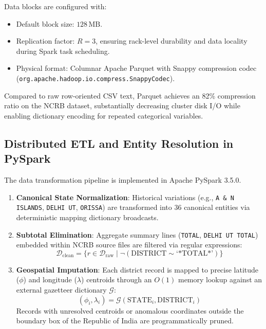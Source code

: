 \documentclass[conference]{IEEEtran}
\begin{document}
Data blocks are configured with:
\begin{itemize}
    \item Default block size: $128\,\text{MB}$.
    \item Replication factor: $R = 3$, ensuring rack-level durability and data locality during Spark task scheduling.
    \item Physical format: Columnar Apache Parquet with Snappy compression codec (\texttt{org.apache.hadoop.io.compress.SnappyCodec}).
\end{itemize}

Compared to raw row-oriented CSV text, Parquet achieves an 82\% compression ratio on the NCRB dataset, substantially decreasing cluster disk I/O while enabling dictionary encoding for repeated categorical variables.

\subsection{Distributed ETL and Entity Resolution in PySpark}
The data transformation pipeline is implemented in Apache PySpark 3.5.0. 
\begin{enumerate}
    \item \textbf{Canonical State Normalization}: Historical variations (e.g., \texttt{A \& N ISLANDS}, \texttt{DELHI UT}, \texttt{ORISSA}) are transformed into 36 canonical entities via deterministic mapping dictionary broadcasts.
    \item \textbf{Subtotal Elimination}: Aggregate summary lines (\texttt{TOTAL}, \texttt{DELHI UT TOTAL}) embedded within NCRB source files are filtered via regular expressions:
    \begin{equation}
        \mathcal{D}_{\text{clean}} = \{ r \in \mathcal{D}_{\text{raw}} \mid \neg (\text{DISTRICT} \sim \text{`*TOTAL*'}) \}
    \end{equation}
    \item \textbf{Geospatial Imputation}: Each district record is mapped to precise latitude ($\phi$) and longitude ($\lambda$) centroids through an $O(1)$ memory lookup against an external gazetteer dictionary $\mathcal{G}$:
    \begin{equation}
        (\phi_i, \lambda_i) = \mathcal{G}(\text{STATE}_i, \text{DISTRICT}_i)
    \end{equation}
    Records with unresolved centroids or anomalous coordinates outside the boundary box of the Republic of India are programmatically pruned.
\end{enumerate}
\end{document}
